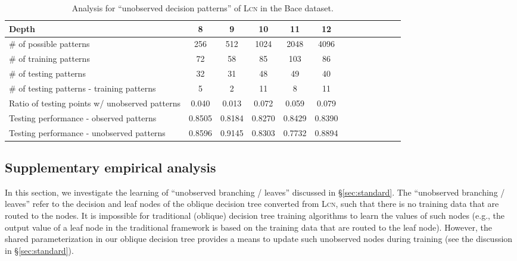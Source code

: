 \documentclass{article} \usepackage{iclr2020_conference,times}
\newcommand{\xref}[1]{\S\ref{#1}}
\begin{document}
\begin{table}[t]
  \vspace{-2mm}
  \caption{Analysis for ``unobserved decision patterns'' of \textsc{Lcn} in the Bace dataset.}\label{tab:appendix:analysis}
  \vspace{-2mm}
  \centering
  \begin{tabular}{lcccccccccccc}
    \toprule
    \small Depth                                            & \small 8      & \small 9      & \small 10     & \small 11     & \small 12\\ \midrule
    \small \# of possible patterns                          & \small 256    & \small 512    & \small 1024   & \small 2048   & \small 4096\\ \small \# of training patterns                          & \small  72    & \small  58    & \small   85   & \small  103   & \small 86\\
    \small \# of testing patterns                           & \small  32    & \small 31     & \small  48    & \small 49     & \small 40 \\
    \small \# of testing patterns - training patterns       & \small  5     & \small  2     & \small  11    & \small 8      & \small 11 \\
    \small Ratio of testing points w/ unobserved patterns   & \small 0.040  & \small 0.013  & \small 0.072  & \small 0.059  & \small 0.079 \\
    \midrule
    \small Testing performance - observed patterns          & \small 0.8505 & \small 0.8184 & \small 0.8270 & \small 0.8429 & \small 0.8390\\
    \small Testing performance - unobserved patterns        & \small 0.8596 & \small 0.9145 & \small 0.8303 & \small 0.7732 & \small 0.8894\\
    \bottomrule
  \end{tabular}
  \vspace{-5mm}
\end{table}


\subsection{Supplementary empirical analysis}

In this section, we investigate the learning of ``unobserved branching / leaves'' discussed in \xref{sec:standard}. The ``unobserved branching / leaves'' refer to the decision and leaf nodes of the oblique decision tree converted from \textsc{Lcn}, such that there is no training data that are routed to the nodes. It is impossible for traditional (oblique) decision tree training algorithms to learn the values of such nodes (e.g., the output value of a leaf node in the traditional framework is based on the training data that are routed to the leaf node). However, the shared parameterization in our oblique decision tree provides a means to update such unobserved nodes during training (see the discussion in \xref{sec:standard}). 
\end{document}
